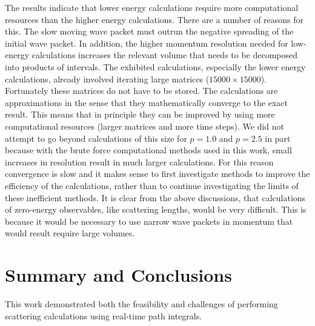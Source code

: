 \documentclass[aps,prc,reprint,noshowpacs,groupedaddress,onecolumn]{revtex4}
\begin{document}


The results indicate that lower energy calculations require more
computational resources than the higher energy calculations. There are
a number of reasons for this.  The slow moving wave packet must outrun
the negative spreading of the initial wave packet.  In addition, the
higher momentum resolution needed for low-energy calculations
increases the relevant volume that needs to be decomposed into
products of intervals.  The exhibited calculations, especially the
lower energy calculations, already involved iterating large matrices
($15000 \times 15000$). Fortunately these matrices do not have to be
stored.  The calculations are approximations in the sense that they
mathematically converge to the exact result.  This means that in
principle they can be improved by using more computational resources
(larger matrices and more time steps).  We did not attempt to go
beyond calculations of this size for $p=1.0$ and $p=2.5$ in part
because with the brute force computational methods used in this work,
small increases in resolution result in much larger calculations.
For this reason convergence is slow and it makes sense to first
investigate methods to improve the efficiency of the calculations,
rather than to continue investigating the limits of these inefficient
methods.  It is clear from the above discussions, that calculations of
zero-energy observables, like scattering lengths, would be very difficult. 
This is because it would be necessary to use narrow wave packets
in momentum that would result require large volumes.


\section{Summary and Conclusions}
 
This work demonstrated both the feasibility and challenges
of performing scattering calculations using real-time path integrals.
\end{document}
